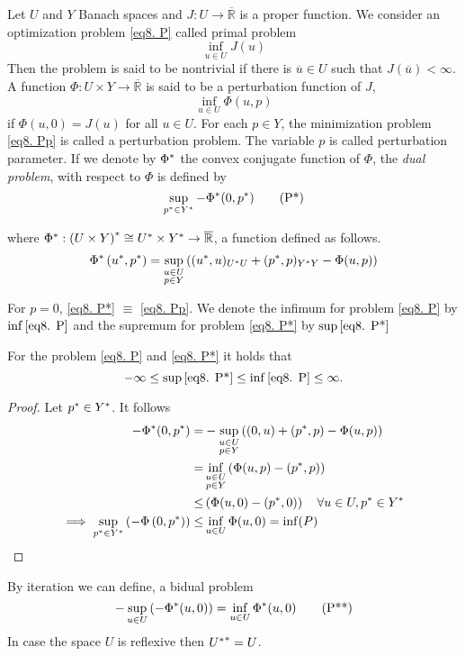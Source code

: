 \begin{definition}
Let $U$ and $Y$ Banach spaces and $J: U\rightarrow \overline{\mathbb{R}}$ is a proper function. We consider an optimization problem \eqref{eq8. P} called primal problem
 \[
 \inf_{u\in U} J(u) \tag{P} \label{eq8. P}
 \] 
 Then the problem is said to be nontrivial if there is $\overline{u} \in U$ such that $J(\overline{u}) < \infty$. A function $\Phi : U \times Y \rightarrow \overline{\mathbb{R}}$ is said to be a perturbation function of $J$, 
 \[
 \inf_{u\in U} \Phi (u,p) \tag{Pp}\label{eq8. Pp}
 \]
 if $\Phi(u, 0)=J(u)$ for all $u \in U$. For each $p \in Y$, the minimization problem \eqref{eq8. Pp} is called a perturbation problem. The variable $p$ is called perturbation parameter. If we denote by ${\Phi}^{\ast}$ the convex conjugate function of $\Phi$, the \textit{dual problem}, with respect to $\Phi$ is defined by
 \[
 \sup_{{p}^{\ast}\in {Y}^{\ast}}-{\Phi}^{\ast}(0,{p}^{\ast}) \label{eq8. P*}\tag{P*}
 \]
 
 where ${\Phi}^{\ast}: {(U\times Y)}^{\ast} \cong {U}^{\ast}\times{Y}^{\ast}\rightarrow \overline{\mathbb{R}}$, a function defined as follows.
 \[
 {\Phi}^{\ast}\left({u}^{\ast}, {p}^{\ast} \right) = \sup_{\substack{u \in U\\ p\in Y}} \left( ({u}^{\ast}, u)_{{U}^{\ast}U}+({p}^{\ast}, p)_{{Y}^{\ast}Y}-\Phi(u,p)\right) 
 \] 

\end{definition}
 \begin{remark}
For $p=0$, \eqref{eq8. P*} $\equiv$ \eqref{eq8. Pp}. We denote the infimum for problem \eqref{eq8. P} by $\inf\eqref{eq8. P}$ and the supremum for problem \eqref{eq8. P*} by $\sup \eqref{eq8. P*}$
 \end{remark}

 
 \begin{lemma}
 	For the problem \eqref{eq8. P} and \eqref{eq8. P*} it holds that
 	\[
 	 -\infty \leq \sup\eqref{eq8. P*} \leq \inf\eqref{eq8. P} \leq \infty.
 	\]
 	\begin{proof}
 		Let ${p}^{\ast}\in{Y}^{\ast}$. It follows
 		\begin{align}
 			-{\Phi}^{\ast}(0,{p}^{\ast})=&-\sup_{\substack{u\in U\\ p\in Y}}\left( (0,u) + ({p}^{\ast}, p)-\Phi(u,p)
 			\right)\\
 			=&\inf_{\substack{u\in U\\p\in Y}} \left(\Phi(u,p)-({p}^{\ast},p)\right)\\
 			\leq & \left(\Phi(u,0)-({p}^{\ast},0) \right) \quad \forall u \in U, {p}^{\ast} \in {Y}^{\ast}\\
 			\implies \sup_{ {p}^{\ast}\in {Y}^{\ast}}\left(-\Phi\left(0, {p}^{\ast}\right) \right) \leq&\inf_{u\in U} \Phi (u, 0) = \inf(P)
 		\end{align}
 	 \end{proof}
 	\end{lemma}
 	By iteration we can define, a bidual problem 
 	\[
 	-\sup_{u \in U} \left(-{\Phi}^{\ast}(u,0)\right)=\inf_{u\in U} {\Phi}^{\ast}(u,0) \tag{P**} \label{eq8. BiDual Problem}
 	\]
 	In case the space $U$ is reflexive then ${{U}^{\ast}}^{\ast}=U$.
 	

